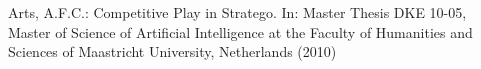\documentclass[12pt,bulgarian,singlespacing,headsepline,oneside,openany]{thesis}
\begin{document}
\newpage


\mainmatter

\pagestyle{thesis}

\renewcommand\thesection{\thechapter.\arabic{section}}
\renewcommand\thesubsection{\thesection.\arabic{subsection}}


 
%
% 
% 


\appendix

%
%
%


\newpage
\begin{thebibliography}{99}

 Arts, A.F.C.: Competitive Play in Stratego. In: Master Thesis DKE 10-05, Master of Science of Artificial Intelligence at the Faculty of Humanities and Sciences of Maastricht University, Netherlands (2010)

\end{thebibliography}


\newpage
\printindex
\end{document}
